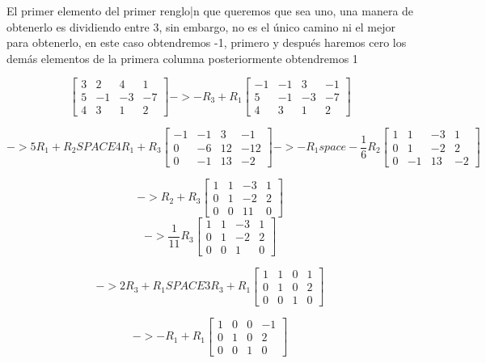 \documentclass{article}
\begin{document}
El primer elemento del primer renglo|n que queremos que sea uno, una manera de obtenerlo es dividiendo entre 3,
sin embargo, no es el único camino ni el mejor para obtenerlo, en este caso obtendremos -1, primero y después haremos cero los demás elementos
de la primera columna posteriormente obtendremos 1


\[
    \begin{bmatrix}3 & 2 & 4 & 1 \\ 5  & -1 & -3 & -7 \\ 4  & 3 & 1  & 2 \end{bmatrix}
    -> -R_3+R_1
    \begin{bmatrix}-1 & -1  & 3 & -1 \\ 5  & -1 & -3 & -7 \\ 4  & 3 & 1  & 2 \end{bmatrix}
\]

\[
    -> 5R_1 + R_2 SPACE 4R_1 + R_3
    \begin{bmatrix} -1 & -1  & 3 & -1 \\ 0  & -6 & 12 & -12 \\ 0  & -1 & 13  & -2 \end{bmatrix}
    -> -R_1 space - \frac{1}{6} R_2
    \begin{bmatrix} 1 & 1  & -3 & 1 \\ 0  & 1 & -2 & 2 \\ 0  & -1 & 13  & -2 \end{bmatrix}
\]



\[
        -> R_2 + R_3
        \begin{bmatrix} 1 & 1  & -3 & 1 \\ 0  & 1 & -2 & 2 \\ 0  & 0 & 11  & 0 \end{bmatrix}
\]
\[
        -> \frac{1}{11} R_3
        \begin{bmatrix} 1 & 1  & -3 & 1 \\ 0  & 1 & -2 & 2 \\ 0  & 0 & 1  & 0 \end{bmatrix}
\]

\[
        -> 2R_3 + R_1 SPACE 3R_3 +R_1
        \begin{bmatrix} 1 & 1  & 0 & 1 \\ 0  & 1 & 0 & 2 \\ 0  & 0 & 1  & 0 \end{bmatrix}
\]

\[
        -> -R_1 + R_1
        \begin{bmatrix} 1 & 0  & 0 & -1 \\ 0  & 1 & 0 & 2 \\ 0  & 0 & 1  & 0 \end{bmatrix}
\]
\end{document}
